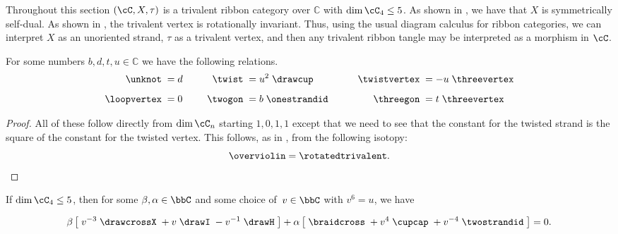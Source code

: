 \documentclass[12pt]{amsart}
\begin{document}
Throughout this section $(\cC, X, \tau)$ is a trivalent ribbon category over
$\mathbb{C}$ with $\dim{\cC_4} \leq 5$.  As shown in \cite[Lemma
2.2]{MR3624901}, we have that $X$ is symmetrically self-dual.  As shown in
\cite[Lemma 8.2]{MR3624901}, the trivalent vertex is rotationally invariant.
Thus, using the usual diagram calculus for ribbon categories, we can interpret
$X$ as an unoriented strand, $\tau$ as a trivalent vertex, and then any
trivalent ribbon tangle may be interpreted as a morphism in $\cC$.

\begin{lemma} \label{lem:constants}
  For some numbers $b, d, t, u \in \mathbb{C}$ we have the following relations.
  \begin{equation}
    \label{eq:simple-rels}
  \begin{aligned}
    \unknot\; &= d&\qquad
      \twist\; &= u^2\;\drawcup&\qquad
        \twistvertex\; &= -u\;\threevertex\\[5pt]
    \loopvertex\;&=0&
      \twogon\;&= b\;\onestrandid&
        \threegon\; &= t\;\threevertex
  \end{aligned}
  \end{equation}
\end{lemma}

\begin{proof}
All of these follow directly from $\dim \cC_n$ starting $1,0,1,1$ except that
we need to see that the constant for the twisted strand is the square of the
constant for the twisted vertex.  This follows, as in
\cite[Lemma~8.2]{MR3624901}, from the following isotopy:
\begin{equation*}
\overviolin = \rotatedtrivalent. \qedhere
\end{equation*}
\end{proof}

\begin{proposition}\label{prop:Jacobi}
If $\dim \cC_4 \leq 5$, then for some $\beta, \alpha \in \bbC$ and some choice
of~$v \in \bbC$ with $v^6 = u$, we have

\begin{equation}
\beta \left[\; v^{-3} \;
\drawcrossX
\;+ v \;
\drawI
\; -v^{-1} \;
 \drawH
\;\right]
 + \alpha
\left[\; \braidcross \;
 + v^{4}\;
\cupcap
\; + v^{-4} \;
 \twostrandid \;
 \right] = 0.\label{eq:quant-except-init}
 \end{equation}
\end{proposition}
\end{document}
